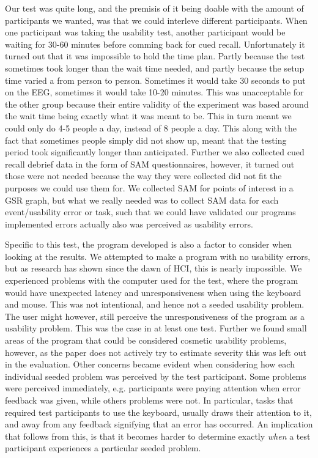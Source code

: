 Our test was quite long, and the premisis of it being doable with the amount of participants we wanted, was that we could interleve different participants. 
When one participant was taking the usability test, another participant would be waiting for 30-60 minutes before comming back for cued recall. 
Unfortunately it turned out that it was impossible to hold the time plan. Partly because the test sometimes took longer than the wait time needed, and partly because the setup time varied a from person to person. Sometimes it would take 30 seconds to put on the EEG, sometimes it would take 10-20 minutes. This was unacceptable for the other group because their entire validity of the experiment was based around the wait time being exactly what it was meant to be.
This in turn meant we could only do 4-5 people a day, instead of 8 people a day. 
This along with the fact that sometimes people simply did not show up, meant that the testing period took significantly longer than anticipated. 
Further we also collected cued recall debrief data in the form of SAM questionnaires, however, it turned out those were not needed because the way they were collected did not fit the purposes we could use them for. We collected SAM for points of interest in a GSR graph, but what we really needed was to collect SAM data for each event/usability error or task, such that we could have validated our programs implemented errors actually also was perceived as usability errors. 

Specific to this test, the program developed is also a factor to consider when looking at the results.  We attempted to
make a program with no usability errors, but as research has shown since the dawn of HCI, this is nearly impossible.  We
experienced problems with the computer used for the test, where the program would have unexpected latency and unresponsiveness when using the keyboard and mouse. This was not intentional, and hence not a seeded usability problem.
The user might however, still perceive the unresponsiveness of the program as a usability problem. 
This was the case in at least one test.  
Further we found small areas of the program that could be considered cosmetic usability problems, however, as the paper does not actively try
to estimate severity this was left out in the evaluation. Other concerns became evident when considering how each
individual seeded problem was perceived by the test participant. Some problems were perceived immediately,
e.g. participants were paying attention when error feedback was given, while others problems were not. In particular,
tasks that required test participants to use the keyboard, usually draws their attention to it, and away from any
feedback signifying that an error has occurred. An implication that follows from this, is that it becomes harder to
determine exactly \textit{when} a test participant experiences a particular seeded problem.


